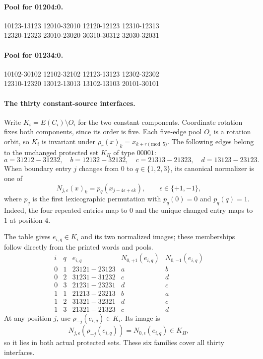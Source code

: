 \documentclass[11pt]{article}
\theoremstyle{remark}
\numberwithin{equation}{section}
\numberwithin{table}{section}
\begin{document}
\paragraph{Pool for 01204:0.}
\begingroup\footnotesize\ttfamily\begin{flushleft}
10123-13123 12010-32010 12120-12123 12310-12313\\
12320-12323 23010-23020 30310-30312 32030-32031\\
\end{flushleft}\endgroup
\paragraph{Pool for 01234:0.}
\begingroup\footnotesize\ttfamily\begin{flushleft}
10102-30102 12102-32102 12123-13123 12302-32302\\
12310-12320 13012-13013 13102-13103 20101-30101\\
\end{flushleft}\endgroup
\paragraph{The thirty constant-source interfaces.}
Write $K_i=E(C_i)\setminus O_i$ for the two constant components.
Coordinate rotation fixes both components, since its order is five.
Each five-edge pool $O_i$ is a rotation orbit, so $K_i$ is invariant
under $\rho_r(x)_k=x_{k+r\pmod5}$. The following edges belong to
the unchanged protected set $K_H$ of type $00001$:
\[
a=31212\!-31232,\quad b=12132\!-32132,\quad
c=21313\!-21323,\quad d=13123\!-23123.
\]
When boundary entry $j$ changes from $0$ to $q\in\{1,2,3\}$,
its canonical normalizer is one of
\[
 N_{j,\epsilon}(x)_k=p_q(x_{j-4\epsilon+\epsilon k}),
 \qquad \epsilon\in\{+1,-1\},
\]
where $p_q$ is the first lexicographic permutation with $p_q(0)=0$
and $p_q(q)=1$. Indeed, the four repeated entries map to $0$ and
the unique changed entry maps to $1$ at position $4$.
\par{}
The table gives $e_{i,q}\in K_i$ and its two normalized images;
these memberships follow directly from the printed words and pools.
\[
\begin{array}{cc|c|cc}
i&q&e_{i,q}&N_{0,+1}(e_{i,q})&N_{0,-1}(e_{i,q})\\ \hline
0&1&23121\!-23123&a&b\\
0&2&31231\!-31232&c&d\\
0&3&21231\!-23231&d&c\\
1&1&21213\!-23213&b&a\\
1&2&31321\!-32321&d&c\\
1&3&21321\!-21323&c&d
\end{array}
\]
At any position $j$, use $\rho_{-j}(e_{i,q})\in K_i$. Its image is
\[
 N_{j,\epsilon}(\rho_{-j}(e_{i,q}))
      =N_{0,\epsilon}(e_{i,q})\in K_H,
\]
so it lies in both actual protected sets. These six families cover
all thirty interfaces.
\end{document}
